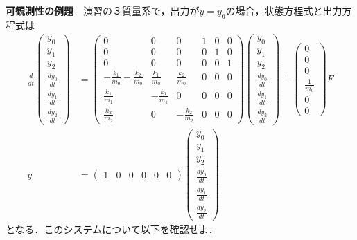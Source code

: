 \documentclass[a4paper,11pt,fleqn]{jreport}
\begin{document}
\noindent
{\bf 可観測性の例題}　演習の３質量系で，出力が$y=y_0$の場合，状態方程式と出力方程式は
\begin{align}
 \frac{d}{dt} \left(\begin{array}{c}
	         y_0 \\
		     y_1 \\
		     y_2 \\
		     \frac{dy_0}{dt} \\
		     \frac{dy_1}{dt} \\
		     \frac{dy_2}{dt}
		    \end{array}\right)
 &=
 \left(\begin{array}{cccccc}
        0 & 0 & 0 & 1 & 0 & 0      \\
        0 & 0 & 0 & 0 & 1 & 0      \\
        0 & 0 & 0 & 0 & 0 & 1      \\
	-\frac{k_1}{m_0} -\frac{k_2}{m_0}&  \frac{k_1}{m_0} &  \frac{k_2}{m_0} & 0 & 0 & 0 \\
	 \frac{k_1}{m_1}                & -\frac{k_1}{m_1} &  0               & 0 & 0 & 0 \\
	 \frac{k_2}{m_2}                &  0               & -\frac{k_2}{m_2} & 0 & 0 & 0 
       \end{array}\right)
 \left(\begin{array}{c}
	         y_0 \\
		     y_1 \\
		     y_2 \\
		     \frac{dy_0}{dt} \\
		     \frac{dy_1}{dt} \\
		     \frac{dy_2}{dt}
       \end{array}\right)
 +
 \left(\begin{array}{c}
        0 \\
        0 \\
        0 \\
	    \frac{1}{m_0} \\
	    0 \\
	    0 
       \end{array}\right)
        F
\nonumber
\\
y &=
 \left(\begin{array}{cccccc}
         1 & 0 & 0 & 0 & 0 & 0
       \end{array}\right)
 \left(\begin{array}{c}
	         y_0 \\
		     y_1 \\
		     y_2 \\
		     \frac{dy_0}{dt} \\
		     \frac{dy_1}{dt} \\
		     \frac{dy_2}{dt}
       \end{array}\right)
\nonumber
\end{align}
となる．このシステムについて以下を確認せよ．
\end{document}
